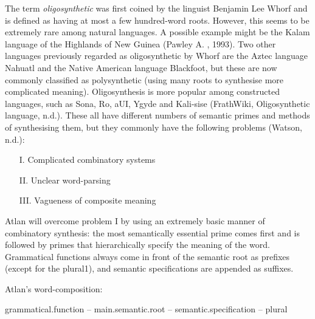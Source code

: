 
The term \textit{oligosynthetic} was first coined by the linguist Benjamin Lee Whorf and is defined as having at most a few hundred-word roots. However, this seems to be extremely rare among natural languages. A possible example might be the Kalam language of the Highlands of New Guinea (Pawley A. , 1993). Two other languages previously regarded as oligosynthetic by Whorf are the Aztec language Nahuatl and the Native American language Blackfoot, but these are now commonly classified as polysynthetic (using many roots to synthesise more complicated meaning). Oligosynthesis is more popular among constructed languages, such as Sona, Ro, aUI, Ygyde and Kali-sise (FrathWiki, Oligosynthetic language, n.d.). These all have different numbers of semantic primes and methods of synthesising them, but they commonly have the following problems (Watson, n.d.): 

\begin{itemize}
\item [I.] Complicated combinatory systems  

\item[II.] Unclear word-parsing  

\item[III.]Vagueness of composite meaning 
\end{itemize}

Atlan will overcome problem I by using an extremely basic manner of combinatory synthesis: the most semantically essential prime comes first and is followed by primes that hierarchically specify the meaning of the word. Grammatical functions always come in front of the semantic root as prefixes (except for the plural1), and semantic specifications are appended as suffixes.  

\quad
\noindent Atlan's word-composition:  

\begin{center}
{grammatical.function –  main.semantic.root – semantic.specification – plural} 
\end{center}
\quad
 

